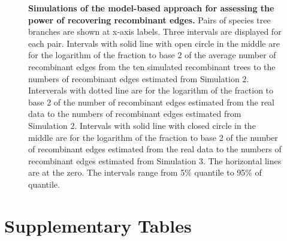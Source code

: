 \documentclass[10pt]{article}
\begin{document}
\begin{figure}



\caption{
{\bf Simulations of the model-based approach for assessing the power of recovering
recombinant edges.} Pairs of species tree branches are shown at x-axis labels.
Three intervals are displayed for each pair. Intervals with solid line with open
circle in the middle are for the logarithm of the fraction to base 2 of the average
number of recombinant edges from the ten simulated recombinant trees 
to the numbers of recombinant edges estimated from Simulation 2. 
Interverals with dotted line are for the logarithm of the fraction to base 2 of
the number of recombinant edges estimated from the real data
to the numbers of recombinant edges estimated from Simulation 2.
Intervals with solid line with closed circle in the middle are for the logarithm
of the fraction to base 2 of the number of recombinant edges estimated from the real data
to the numbers of recombinant edges estimated from Simulation 3. 
The horizontal lines are at the zero.
The intervals range from 5\% quantile to 95\% of quantile.}
\label{fig:h3}
\end{figure}
\clearpage{}%

\clearpage{}\setcounter{figure}{0}
\setcounter{table}{0}
\renewcommand{\figurename}{Supplementary Figure}
\renewcommand{\tablename}{Supplementary Table}

\section*{Supplementary Tables}
\end{document}
